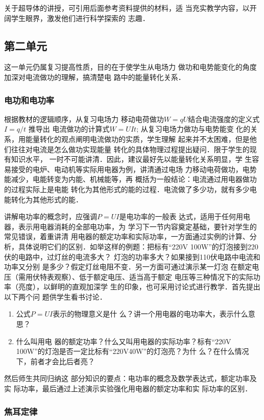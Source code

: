 关于超导体的讲授，可引用后面参考资料提供的材料，适
当充实教学内容，以开阔学生眼界，激发他们进行科学探索的
志趣．

\subsection{第二单元}
这一单元仍属复习提高性质，目的在于使学生从电场力
做功和电势能变化的角度加深对电流做功的理解，搞清楚电
路中的能量转化关系．

\subsubsection{电功和电功率}

根据教材的逻辑顺序，从复习电场力
移动电荷做功$W=qU$结合电流强度的定义式$I=q/t$
推导出
电流做功的计算式$W=UIt$; 从复习电场力做功与电势能变
化的关系，用能量转化的观点阐明电流做功的实质，学生理解
起来并不太困难，但是他们往往对电流是怎么做功实现能量
转化的具体物理过程提出疑问．限于学生的现有知识水平，
一时不可能讲清．因此，建议最好先以能量转化关系明显，学
生容易接受的电炉、电动机等实际用电器为例，讲清通过电场
力移动电荷做功，电势能减少，电能转变为内能、机械能等，再
概括为一般结论：电流通过用电器做功的过程实际上是电能
转化为其他形式的能的过程．电流做了多少功，就有多少电
能转化为其他形式的能．

讲解电功率的概念时，应强调$P=UI$是电功率的一般表
达式，适用于任何用电器，表示用电器消耗的全部电功率，为
学习下一节内容奠定基础，要针对学生的常见错误，着重讲清
用电器的额定功率和实际功率，一方面通过实例的计算、分
析，具体说明它们的区别．如举这样的例题：把标有“220V
100W”的灯泡接到220伏的电路中，过灯丝的电流多大？
灯泡的功率多大？如果接到110伏电路中电流和功率又分别
是多少？假定灯丝电阻不变．另一方面可通过演示某一灯泡
在额定电压（需用伏特表观察）、低于额定电压、适当高于额定
电压等三种情况下的实际功率（亮度），以鲜明的直观加深学
生的印象，也可采用讨论式进行教学．首先提出以下两个问
题供学生看书讨论．
\begin{enumerate}
\item 公式$P=UI$表示的物理意义是什
么？讲一个用电器的电功率大，表示什么意思？   
 \item 什么叫用电
器的额定功率？什么又叫用电器的实际功率？标有“220V
100W”的灯泡是否一定比标有“220V40W”的灯泡亮？为什
么？在什么情况下，前者才会比后者亮？
\end{enumerate}
然后师生共同归纳这
部分知识的要点：电功率的概念及数学表达式，额定功率及实
际功率，最后通过上述演示实验强化用电器的额定功率和实
际功率的区别．

\subsubsection{焦耳定律}


